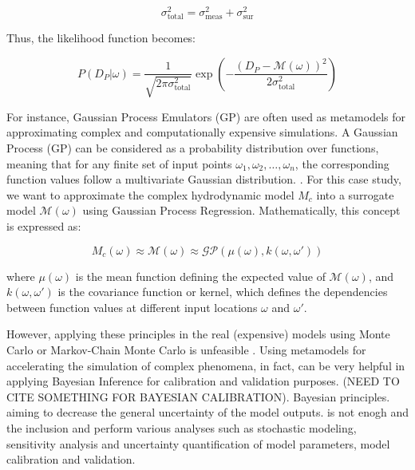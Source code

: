 \documentclass[draft,linenumbers,onecolumn]{agujournal2019} %
\begin{document}
\[
\sigma_{\text{total}}^2 = \sigma_{\text{meas}}^2 + \sigma_{\text{sur}}^2
\]

Thus, the likelihood function becomes:

\[
P(D_P | \omega) = \frac{1}{\sqrt{2\pi \sigma_{\text{total}}^2}} \exp\left( - \frac{(D_P - \mathcal{M}(\omega))^2}{2 \sigma_{\text{total}}^2} \right)
\] 


For instance, Gaussian Process Emulators (GP) are often used as metamodels for approximating complex and computationally expensive simulations. A Gaussian Process (GP) can be considered as a probability distribution over functions, meaning that for any finite set of input points 
\( \omega_1, \omega_2, \dots, \omega_n \), the corresponding function values follow a multivariate Gaussian distribution. \cite{MachineLearningFirst2021}.  For this case study, we want to approximate the complex hydrodynamic model \( M_c \) into a surrogate model  \( \mathcal{M}(\omega) \) using Gaussian Process Regression. Mathematically, this concept is expressed as:  

\[
M_c(\omega) \approx \mathcal{M}(\omega) \approx \mathcal{GP}(\mu(\omega), k(\omega, \omega'))
\]

where \( \mu(\omega) \) is the mean function defining the expected value of \( \mathcal{M}(\omega) \), and \( k(\omega, \omega') \) is the covariance function or kernel, which defines the dependencies between function values at different input locations \( \omega \) and \( \omega' \).



However, applying these principles in the real (expensive) models using Monte Carlo or Markov-Chain Monte Carlo is unfeasible \cite{oladyshkin2020bayesian3}. Using metamodels for accelerating the simulation of complex phenomena, in fact, can be very helpful in applying Bayesian Inference for calibration and validation purposes. \cite{bibid} (NEED TO CITE SOMETHING FOR BAYESIAN CALIBRATION). Bayesian principles.  aiming to decrease the general uncertainty of the model outputs.  is not enogh and the inclusion and perform various analyses such as stochastic modeling, sensitivity analysis and uncertainty quantification of model parameters, model calibration and validation.
\end{document}
